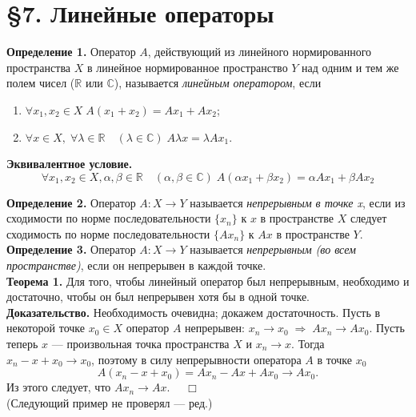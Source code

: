 \documentclass[12pt,a4paper, titlepage]{article}
\begin{document}
\section*{ \S 7. Линейные операторы}

\textbf{Определение 1.} Оператор $A$, действующий из линейного нормированного пространства $X$ в линейное нормированное пространство $Y$ над одним и тем же полем чисел ($\mathbb R$ или $\mathbb C$), называется \textit{линейным оператором}, если 
\begin{enumerate}
\item
$\forall x_1, x_2 \in X \; A(x_1 + x_2) = Ax_1 + Ax_2$;
\item
$\forall x \in X, \; \forall \lambda \in \mathbb R \quad (\lambda \in \mathbb C) \; A \lambda x = \lambda A x_1$.
\end{enumerate}

\textbf{Эквивалентное условие.}
$$\forall x_1, x_2 \in X, \alpha, \beta \in \mathbb{R} \quad (\alpha, \beta \in \mathbb{C}) \; A(\alpha x_1 + \beta x_2) = \alpha Ax_1 + \beta Ax_2$$

\textbf{Определение 2.} Оператор $A: X \to Y$ называется \textit{непрерывным в точке x}, если из сходимости по норме последовательности $\lbrace x_n \rbrace$ к $x$ в пространстве $X$ следует сходимость по норме последовательности $\lbrace A x_n \rbrace$ к $A x$ в пространстве $Y$.\\

\textbf{Определение 3.} Оператор $A: X \to Y$ называется \textit{непрерывным (во всем пространстве)}, если он непрерывен в каждой точке. \\

\textbf{Теорема 1.} Для того, чтобы линейный оператор был непрерывным, необходимо и достаточно, чтобы он был непрерывен хотя бы в одной точке.\\
\textbf{Доказательство.} Необходимость очевидна; докажем достаточность. Пусть в некоторой точке $x_0 \in X$ оператор $A$ непрерывен: $ x_n \to x_0 \; \Rightarrow \; Ax_n \to Ax_0$. Пусть теперь $x$ --- произвольная точка пространства $X$ и $x_n \to x$. Тогда $x_n - x + x_0 \to x_0$, поэтому в силу непрерывности оператора $A$ в точке $x_0$
$$
A(x_n - x + x_0) = Ax_n - Ax + Ax_0 \to Ax_0.
$$
Из этого следует, что $Ax_n \to Ax$. $\quad \Box$\\

(Следующий пример не проверял --- ред.)
\end{document}
